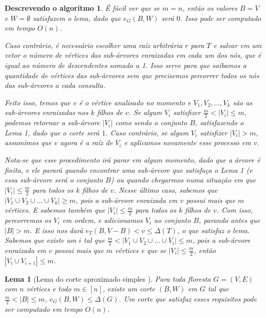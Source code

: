 \documentclass[a4paper,12pt]{article}
\newtheorem{lem}{Lema}
\newtheorem{alg}{Descrevendo o algoritmo}
\begin{document}
\begin{alg}
	É fácil ver que se $m=n$, então os valores $B = V$ e $W = \emptyset$ 
	satisfazem o lema, dado que $e_G(B,W)$ será $0$. Isso pode ser 
	computado em tempo $O(n)$.

	Caso contrário, é necessário escolher uma raíz arbitrária $r$ para $T$
	e salvar em um vetor o número de vértices das sub-árvores enraizadas 
	em cada um dos nós, que é igual ao número de descendentes somado a 1.
	Isso serve para que saibamos a quantidade de vértices das sub-árvores
	sem que precisemos percorrer todos os nós das sub-árvores a cada consulta.

	Feito isso, temos que $v$ é o vértice analisado no momento e 
	$V_1, V_2, \ldots, V_k$ são as sub-árvores enraizadas nos $k$ filhos
	de $v$.
	Se algum $V_i$ satisfizer $\frac{m}{2}<|V_i|\le m$, podemos retornar
	a sub-árvore $|V_i|$ como sendo o conjunto $B$, satisfazendo o Lema 1,
	dado que o corte será $1$.
	Caso contrário, se algum $V_i$ satisfizer $|V_i|> m$, assumimos que 
	$v$ agora é a raíz de $V_i$ e aplicamos novamente esse processo em $v$.

	Nota-se que esse procedimento irá parar em algum momento, dado que a árvore 
	é finita, e ele parará quando encontrar
	uma sub-árvore que satisfaça o Lema 1 (e essa sub-árvore será o conjunto $B$) 
	ou quando chegarmos numa situação em que  
	$|V_i|\le \frac{m}{2}$ para todos os $k$ filhos de $v$.
	Nesse último caso, sabemos que $|V_1\cup V_2\cup \ldots \cup V_k|\ge m$, pois
	a sub-árvore enraizada em $v$ possui mais que $m$ vértices. 
	E sabemos também que $|V_i|\le \frac{m}{2}$ para todos os $k$ filhos de $v$. 
	Com isso, percorremos os $V_i$ em ordem, e 
	adicionamos $V_i$ ao conjunto $B$, parando antes que $|B| > m$. E isso nos dará
	$e_T(B,V-B) < v \le \Delta(T)$, o que satisfaz o lema.
	Sabemos que existe um $i$ tal que 
	$\frac{m}{2} < |V_1 \cup V_2 \cup \ldots \cup V_i| \le m$, pois a sub-árvore
	enraizada em $v$ possui mais que $m$ vértices e que se $|V_i|\le \frac{m}{2}$,
	então $|V_i \cup V_{i+1}| \le m$.

\end{alg}


\bigskip
\bigskip
\bigskip
\bigskip
\bigskip
\bigskip
\bigskip
\bigskip

\begin{lem}[Lema do corte aproximado simples {\cite[Lemma 2]{Schmidt15}}]

	Para toda floresta $G=(V,E)$ com $n$ vértices e todo $m \in [n]$,
	existe um corte $(B,W)$ em $G$ tal que 
	$\frac{m}{2} <|B| \le m$,
	$e_G(B,W) \le \Delta(G)$.
	Um corte que satisfaz esses requisitos pode ser computado em
	tempo $O(n)$.
\end{lem}
\end{document}
